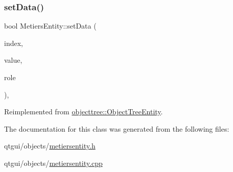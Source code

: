 \subsubsection{\texorpdfstring{setData()}{setData()}}
{\footnotesize\ttfamily bool Metiers\+Entity\+::set\+Data (\begin{DoxyParamCaption}\item[{const Q\+Model\+Index \&}]{index,  }\item[{const Q\+Variant \&}]{value,  }\item[{int}]{role }\end{DoxyParamCaption})\hspace{0.3cm}{\ttfamily [override]}, {\ttfamily [virtual]}}



Reimplemented from \mbox{\hyperlink{classobjecttree_1_1_object_tree_entity_ab6742194e637093cb1571998bee88ff5}{objecttree\+::\+Object\+Tree\+Entity}}.



The documentation for this class was generated from the following files\+:\begin{DoxyCompactItemize}
\item 
qtgui/objects/\mbox{\hyperlink{metiersentity_8h}{metiersentity.\+h}}\item 
qtgui/objects/\mbox{\hyperlink{metiersentity_8cpp}{metiersentity.\+cpp}}\end{DoxyCompactItemize}
